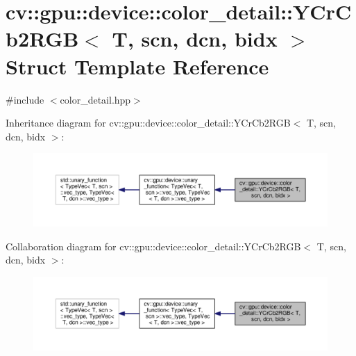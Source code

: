 \hypertarget{structcv_1_1gpu_1_1device_1_1color__detail_1_1YCrCb2RGB}{\section{cv\-:\-:gpu\-:\-:device\-:\-:color\-\_\-detail\-:\-:Y\-Cr\-Cb2\-R\-G\-B$<$ T, scn, dcn, bidx $>$ Struct Template Reference}
\label{structcv_1_1gpu_1_1device_1_1color__detail_1_1YCrCb2RGB}
}


{\ttfamily \#include $<$color\-\_\-detail.\-hpp$>$}



Inheritance diagram for cv\-:\-:gpu\-:\-:device\-:\-:color\-\_\-detail\-:\-:Y\-Cr\-Cb2\-R\-G\-B$<$ T, scn, dcn, bidx $>$\-:\nopagebreak
\begin{figure}[H]
\begin{center}
\leavevmode
\includegraphics[width=350pt]{structcv_1_1gpu_1_1device_1_1color__detail_1_1YCrCb2RGB__inherit__graph}
\end{center}
\end{figure}


Collaboration diagram for cv\-:\-:gpu\-:\-:device\-:\-:color\-\_\-detail\-:\-:Y\-Cr\-Cb2\-R\-G\-B$<$ T, scn, dcn, bidx $>$\-:\nopagebreak
\begin{figure}[H]
\begin{center}
\leavevmode
\includegraphics[width=350pt]{structcv_1_1gpu_1_1device_1_1color__detail_1_1YCrCb2RGB__coll__graph}
\end{center}
\end{figure}
